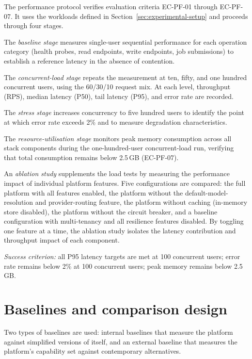 \documentclass[a4paper,noexaminfo]{sapthesis}
\begin{document}
The performance protocol verifies evaluation criteria EC-PF-01 through
EC-PF-07.  It uses the workloads defined in
Section~\ref{sec:experimental-setup} and proceeds through four stages.

The \emph{baseline stage} measures single-user sequential performance for
each operation category (health probes, read endpoints, write endpoints,
job submissions) to establish a reference latency in the absence of
contention.

The \emph{concurrent-load stage} repeats the measurement at ten, fifty,
and one hundred concurrent users, using the 60/30/10 request mix.  At
each level, throughput (RPS), median latency (P50), tail latency (P95),
and error rate are recorded.

The \emph{stress stage} increases concurrency to five hundred users to
identify the point at which error rate exceeds 2\% and to measure
degradation characteristics.

The \emph{resource-utilisation stage} monitors peak memory consumption
across all stack components during the one-hundred-user concurrent-load
run, verifying that total consumption remains below 2.5\,GB (EC-PF-07).

An \emph{ablation study} supplements the load tests by measuring the
performance impact of individual platform features.  Five configurations
are compared: the full platform with all features enabled, the platform
without the default-model-resolution and provider-routing feature, the
platform without caching (in-memory store disabled), the platform without
the circuit breaker, and a baseline configuration with multi-tenancy and
all resilience features disabled.  By toggling one feature at a time, the
ablation study isolates the latency contribution and throughput impact of
each component.

\medskip
\noindent\emph{Success criterion:} all P95 latency targets are met at
100 concurrent users; error rate remains below 2\% at 100 concurrent
users; peak memory remains below 2.5\,GB.


\section{Baselines and comparison design}
\label{sec:baselines}

Two types of baselines are used: internal baselines that measure the
platform against simplified versions of itself, and an external baseline
that measures the platform's capability set against contemporary
alternatives.
\end{document}
